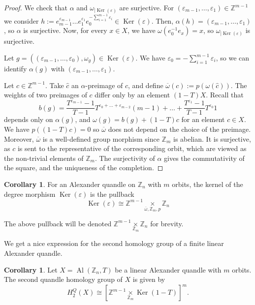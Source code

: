 \documentclass[a4paper,11pt]{amsart}
\theoremstyle{definition}
\newtheorem{cor}[thm]{Corollary}
\newcommand{\Z}{{\mathbb Z}}
\DeclareMathOperator{\Ker}{Ker}
\DeclareMathOperator{\Al}{Al}
\newcommand{\znz}[1]{\Z_{#1}}
\begin{document}
\begin{proof}
We check that $\alpha$ and $\omega_{\vert \Ker(\varepsilon)}$ are surjective.
For $(\varepsilon_{m-1}, \ldots, \varepsilon_1)\in \Z^{m-1}$ we consider $h:= e_{m-1}^{\varepsilon_{m-1}} \ldots e_1^{\varepsilon_1} e_0^{-\sum\limits_{i=1}^{m-1} \varepsilon_i} \in \Ker(\varepsilon)$. Then, $\alpha(h) = (\varepsilon_{m-1}, \ldots, \varepsilon_1)$, so $\alpha$ is surjective.
Now, for every $x\in X$, we have $\omega(e_0^{-1} e_x) = x$, so $\omega_{\vert \Ker(\varepsilon)}$ is surjective.

Let $g=\left( (\varepsilon_{m-1}, \ldots, \varepsilon_0), \omega_g\right)\in\Ker(\varepsilon)$.
We have $\varepsilon_0= -\sum\limits_{i=1}^{m-1} \varepsilon_i$, so we can identify $\alpha(g)$ with $(\varepsilon_{m-1}, \ldots, \varepsilon_1)$.

Let $c\in \Z^{m-1}$.
Take $\widehat{c}$ an $\alpha$-preimage of $c$, and define $\overline{\omega}(c):= p( \omega(\widehat{c}) )$.
The weights of two preimages of $c$ differ only by an element $(1-T)X$.
Recall that
\[
b(g)=\frac{T^{\varepsilon_{m-1}} -1}{T-1} T^{\varepsilon_0+\ldots+ \varepsilon_{m-2}} (m-1) + \ldots + \frac{T^{\varepsilon_1} -1}{T-1}T^{\varepsilon_0} 1\]
depends only on $\alpha(g)$, and $\omega(g)=b(g) + (1-T)c$ for an element $c\in X$.
We have $p((1-T)c) = 0$ so $\overline{\omega}$ does not depend on the choice of the preimage.
Moreover, $\overline{\omega}$ is a well-defined group morphism since $\znz{m}$ is abelian.
It is surjective, as $c$ is sent to the representative of the corresponding orbit, which are viewed as the non-trivial elements of $\znz{m}$.
The surjectivity of $\alpha$ gives the commutativity of the square, and the uniqueness of the completion.
\end{proof}

\begin{cor}
For an Alexander quandle on $\znz{n}$ with $m$ orbits, the kernel of the degree morphism $\Ker(\varepsilon)$ is the pullback
\[
\Ker(\varepsilon) \cong \Z^{m-1} \underset{\overline{\omega},\znz{m}, p}{\times} \znz{n}
\]
\end{cor}
The above pullback will be denoted $\Z^{m-1} \underset{\znz{m}}{\times} \znz{n}$ for brevity.

We get a nice expression for the second homology group of a finite linear Alexander quandle.
\begin{cor}\label{cor:H2}
Let $X=\Al(\znz{n},T)$ be a linear Alexander quandle with $m$ orbits.
The second quandle homology group of $X$ is given by
\[
H_2^Q(X) \cong \left[ \Z^{m-1} \underset{\znz{m}}{\times} \Ker(1-T) \right]^m.
\]
\end{cor}
\end{document}
